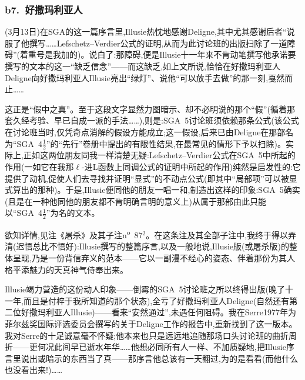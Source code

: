 \subsubsection*{b7.~好撒玛利亚人}


(3月13日)在SGA的这一篇序言里,Illusie热忱地感谢Deligne,其中尤其感谢后者“说服了他撰写……Lefschetz--Verdier公式的证明,从而为此讨论班的出版扫除了一道障碍”(着重号是我加的)。说白了:那障碍,便是Illusie十一年来不肯动笔撰写他承诺要撰写的文本的这一“缺乏信念”——而这缺乏,如上文所说,恰恰在好撒玛利亚人Deligne向好撒玛利亚人Illusie亮出“绿灯”、说他“可以放手去做”的那一刻,戛然而止……

这正是“假中之真”。至于这段文字显然力图暗示、却不必明说的那个“假”(循着那套久经考验、早已自成一派的手法……),则是:SGA~5讨论班须依赖那条公式(该公式在讨论班当时,仅凭奇点消解的假设方能成立;这一假设,后来已由Deligne在那部名为“SGA~4$\frac{1}{2}$”的“先行”卷册中提出的有限性结果,在最常见的情形下予以扫除)。实际上,正如这两位朋友同我一样清楚无疑:Lefschetz--Verdier公式在SGA~5中所起的作用(一如它在我那$\ell$-进L函数上同调公式的证明中所起的作用)纯然是启发性的:它提供了动机,促使人们去寻找并证明“显式”的不动点公式(即其中“局部项”可以被显式算出的那种)。于是,Illusie便同他的朋友一唱一和,制造出这样的印象:SGA~5确实(且是在一种他同他的朋友都不肯明确言明的意义上)从属于那部由此只能以“SGA~4$\frac{1}{2}$”为名的文本。

欲知详情,见注《屠杀》及其子注n\textsuperscript{o}~87$^2$。在这条注及其全部子注中,我终于得以弄清(迟悟总比不悟好):Illusie撰写的整篇序言,以及一般地说,Illusie版(或屠杀版)的整体呈现,乃是一份背信弃义的范本——它以一副漫不经心的姿态、伴着那份为其人格平添魅力的天真神气侍奉出来。

Illusie竭力营造的这份动人印象——倒霉的SGA~5讨论班之所以终得出版(晚了十一年,而且是付梓于我所知道的那个状态),全亏了好撒玛利亚人Deligne(自然还有第二位好撒玛利亚人Illusie)——看来“安然通过”,未遇任何阻碍。我在Serre1977年为菲尔兹奖国际评选委员会撰写的关于Deligne工作的报告中,重新找到了这一版本。我对Serre的十足诚意毫不怀疑;他本来也只是远远地追随那场口头讨论班的曲折周折——更何况此间早已逝水年华……他想必同所有人一样、不加质疑地,把Illusie序言里说出或暗示的东西当了真——那序言他总该有一天翻过,为的是看看(而他什么也没看出来!)……

